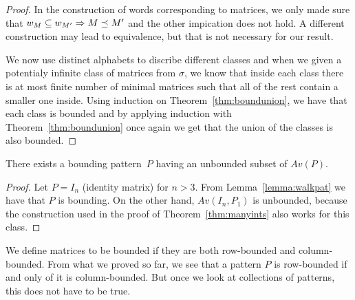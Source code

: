 \begin{proof}
In the construction of words corresponding to matrices, we only made sure that $w_M\subseteq w_{M'}\Rightarrow M\preceq M'$ and the other impication does not hold. A different construction may lead to equivalence, but that is not necessary for our result.

We now use distinct alphabets to discribe different classes and when we given a potentialy infinite class of matrices from $\sigma$, we know that inside each class there is at most finite number of minimal matrices such that all of the rest contain a smaller one inside. Using induction on Theorem~\ref{thm:boundunion}, we have that each class is bounded and by applying induction with Theorem~\ref{thm:boundunion} once again we get that the union of the classes is also bounded.
\end{proof}

\begin{obs}
There exists a bounding pattern~$P$ having an unbounded subset of $Av(P)$.
\end{obs}
\begin{proof}
Let $P=I_n$ (identity matrix) for $n>3$. From Lemma~\ref{lemma:walkpat} we have that $P$ is bounding. On the other hand, $Av(I_n,P_1)$ is unbounded, because the construction used in the proof of Theorem~\ref{thm:manyints} also works for this class.
\end{proof}

We define matrices to be bounded if they are both row-bounded and column-bounded. From what we proved so far, we see that a pattern $P$ is row-bounded if and only of it is column-bounded. But once we look at collections of patterns, this does not have to be true.

